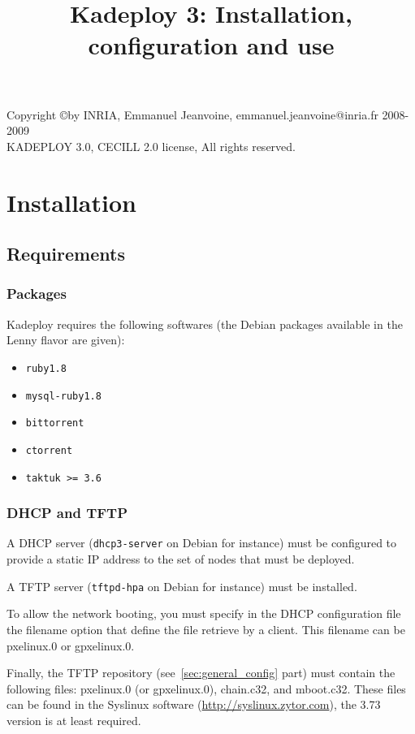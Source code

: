 \documentclass[a4wide,10pt,oneside]{book}
\title{Kadeploy 3: Installation, configuration and use}
\begin{document}
\maketitle

\vspace*{18cm}
\noindent Copyright \copyright by INRIA, Emmanuel Jeanvoine, emmanuel.jeanvoine@inria.fr 2008-2009\\
KADEPLOY 3.0, CECILL 2.0 license, All rights reserved.

\tableofcontents

\chapter{Installation}
\section{Requirements}
\subsection{Packages}\label{sec:required-packages}
Kadeploy requires the following softwares (the Debian packages available in the Lenny flavor are given):
\begin{itemize}
\item \texttt{ruby1.8}
\item \texttt{mysql-ruby1.8}
\item \texttt{bittorrent}
\item \texttt{ctorrent}
\item \texttt{taktuk >= 3.6}
\end{itemize}

\subsection{DHCP and TFTP}
A DHCP server (\texttt{dhcp3-server} on Debian for instance) must be configured to provide a static IP address to the set of nodes that must be deployed.

A TFTP server (\texttt{tftpd-hpa} on Debian for instance) must be installed.

To allow the network booting, you must specify in the DHCP configuration file the filename option that define the file retrieve by a client. This filename can be pxelinux.0 or gpxelinux.0.

Finally, the TFTP repository (see~\ref{sec:general_config} part) must contain the following files: pxelinux.0 (or gpxelinux.0), chain.c32, and mboot.c32. These files can be found in the Syslinux software (\url{http://syslinux.zytor.com}), the 3.73 version is at least required.
\end{document}
